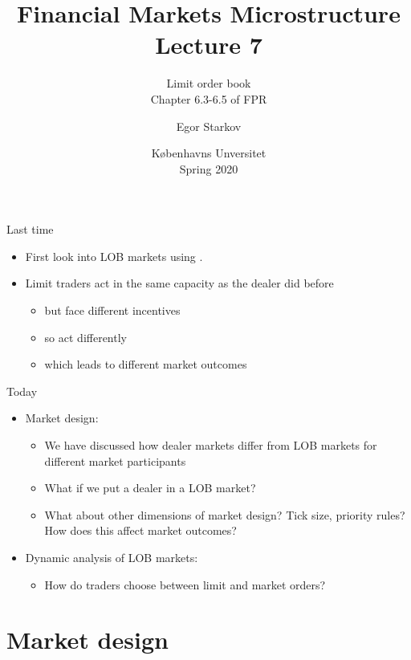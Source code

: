 \documentclass[english,10pt
,aspectratio=169
]{beamer}
\title{Financial Markets Microstructure \\ Lecture 7}
\subtitle{Limit order book\\
	Chapter 6.3-6.5 of FPR}
\author{Egor Starkov}
\date{K{\o}benhavns Unversitet \\
	Spring 2020}
\begin{document}
\frame[plain]{\titlepage}


\begin{frame}{Last time}
	\begin{itemize}
		\item First look into LOB markets using \cite{glosten_is_1994}.
		\item Limit traders act in the same capacity as the dealer did before
		\begin{itemize}
			\item but face different incentives
			\item so act differently
			\item which leads to different market outcomes
		\end{itemize}
	\end{itemize}
\end{frame}


\begin{frame}{Today}
	\begin{itemize}
		\item Market design:
		\begin{itemize}
			\item We have discussed how dealer markets differ from LOB markets for different market participants
			\item What if we put a dealer in a LOB market?
			\item What about other dimensions of market design? Tick size, priority rules? How does this affect market outcomes?
		\end{itemize}
		\item Dynamic analysis of LOB markets:
		\begin{itemize}
			\item How do traders choose between limit and market orders?
		\end{itemize}
	\end{itemize}
\end{frame}







\section{Market design}
\end{document}
